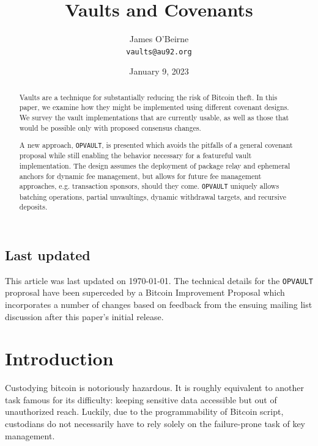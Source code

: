 \documentclass[10pt]{article}
\author{James O'Beirne \\
  \texttt{vaults@au92.org}
}
\date{January 9, 2023}
\title{Vaults and Covenants}
\begin{document}
\newcommand{\ctv}{\texttt{OP\textunderscore{}CHECKTEMPLATEVERIFY}}
\newcommand{\opv}{\texttt{OP\textunderscore{}VAULT}}
\newcommand{\opuv}{\texttt{OP\textunderscore{}UNVAULT}}
\newcommand{\spk}{\code{scriptPubKey}}
\newcommand{\code}[1]{\texttt{#1}}


\maketitle
\begin{abstract}

  Vaults are a technique for substantially reducing the risk of Bitcoin theft. In this
  paper, we examine how they might be implemented using different covenant designs. We
  survey the vault implementations that are currently usable, as well as those that
  would be possible only with proposed consensus changes. 

  A new approach, \opv{}, is presented which avoids the pitfalls of a general covenant
  proposal while still enabling the behavior necessary for a featureful vault
  implementation. The design assumes the deployment of package relay and ephemeral
  anchors for dynamic fee management, but allows for future fee management approaches,
  e.g. transaction sponsors, should they come. \opv{} uniquely allows batching operations,
  partial unvaultings, dynamic withdrawal targets, and recursive deposits.

\end{abstract}

\subsection*{Last updated}

This article was last updated on \today{}. The technical details for the \opv{}
proprosal have been superceded by a Bitcoin Improvement Proposal \cite{Bip} which 
incorporates a number of changes based on feedback from the ensuing mailing list
discussion \cite{Ml} after this paper's initial release.

\section*{Introduction}

Custodying bitcoin is notoriously hazardous. It is roughly equivalent to
another task famous for its difficulty: keeping sensitive data accessible but out
of unauthorized reach. Luckily, due to the programmability of Bitcoin script,
custodians do not necessarily have to rely solely on the failure-prone task of key
management.
\end{document}
